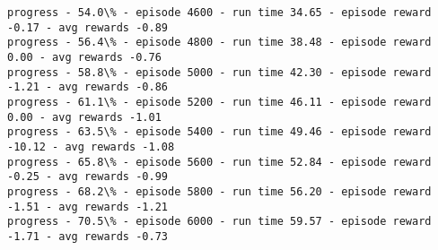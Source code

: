 \documentclass[11pt]{article}
\begin{document}
\begin{Verbatim}[commandchars=\\\{\}]
progress - 54.0\% - episode 4600 - run time 34.65 - episode reward -0.17 - avg rewards -0.89
progress - 56.4\% - episode 4800 - run time 38.48 - episode reward 0.00 - avg rewards -0.76
progress - 58.8\% - episode 5000 - run time 42.30 - episode reward -1.21 - avg rewards -0.86
progress - 61.1\% - episode 5200 - run time 46.11 - episode reward 0.00 - avg rewards -1.01
progress - 63.5\% - episode 5400 - run time 49.46 - episode reward -10.12 - avg rewards -1.08
progress - 65.8\% - episode 5600 - run time 52.84 - episode reward -0.25 - avg rewards -0.99
progress - 68.2\% - episode 5800 - run time 56.20 - episode reward -1.51 - avg rewards -1.21
progress - 70.5\% - episode 6000 - run time 59.57 - episode reward -1.71 - avg rewards -0.73

    \end{Verbatim}
\end{document}
